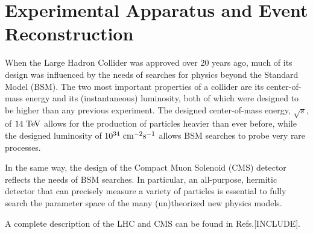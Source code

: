 \chapter{Experimental Apparatus and Event Reconstruction}

When the Large Hadron Collider was approved over 20 years ago, much of its design was influenced by the needs of searches for physics beyond the Standard Model (BSM).
The two most important properties of a collider are its center-of-mass energy and its (instantaneous) luminosity, both of which were designed to be higher than any previous experiment. 
The designed center-of-mass energy, $\sqrt{s}$, of $14~\mathrm{Te\kern -0.1em V}$ allows for the production of particles heavier than ever before, while the designed luminosity of $10^{34}~\mathrm{cm}^{-2}\mathrm{s}^{-1}$ allows BSM searches to probe very rare processes.

In the same way, the design of the Compact Muon Solenoid (CMS) detector reflects the needs of BSM searches.
In particular, an all-purpose, hermitic detector that can precisely measure a variety of particles is essential to fully search the parameter space of the many (un)theorized new physics models.

A complete description of the LHC and CMS can be found in Refs.[INCLUDE].

